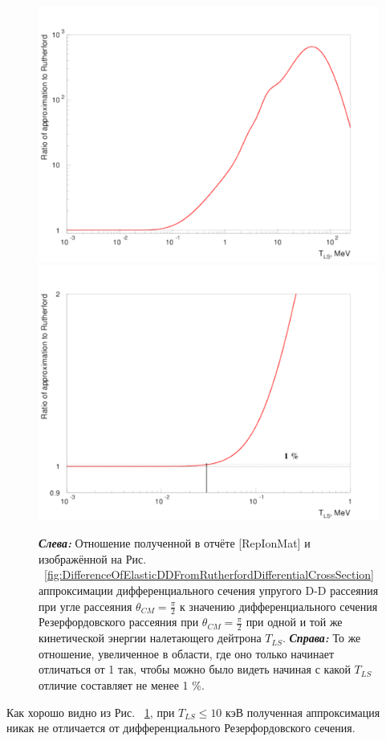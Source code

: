 \documentclass[a4paper,12pt]{article}
\begin{document}
\begin{large}
	
\begin{figure}[ht]
  {
     \includegraphics[width=0.5\linewidth]{images/ratio_of_elastic_dd_at_90_grades.pdf}
     \includegraphics[width=0.5\linewidth]{images/ratio_of_elastic_dd_at_90_grades_find_1_percent_diff.pdf}
  }
  \caption{\textit{\textbf{Слева:}} Отношение полученной в отчёте [RepIonMat] и изображённой на Рис. ~\ref{fig:DifferenceOfElasticDDFromRutherfordDifferentialCrossSection} аппроксимации дифференциального сечения упругого D-D рассеяния при угле рассеяния $\theta_{CM}=\frac{\pi}{2}$ к значению дифференциального сечения Резерфордовского рассеяния при $\theta_{CM}=\frac{\pi}{2}$ при одной и той же кинетической энергии налетающего дейтрона $T_{LS}$.
  \textit{\textbf{Справа:}} То же отношение, увеличенное в области, где оно только начинает отличаться от 1 так, чтобы можно было видеть начиная с какой $T_{LS}$ отличие составляет не менее 1 \%.}
  \label{fig:RatioOfElasticDDAt90Grades}
\end{figure}	
	
	
	Как хорошо видно из Рис. ~\ref{fig:RatioOfElasticDDAt90Grades}, при $T_{LS} \leq 10$ кэВ полученная аппроксимация никак не отличается от дифференциального Резерфордовского сечения.
	

\end{large}
\end{document}
